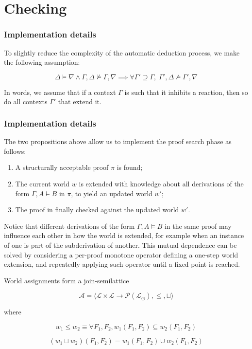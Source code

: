 \section{Checking}



\subsubsection{Implementation details}

To slightly reduce the complexity of the automatic deduction process, we make
the following assumption:

\[
  \Delta \models \nabla \wedge \Gamma, \Delta \not \models \Gamma, \nabla
  \implies \forall \Gamma'
  \supseteq \Gamma, \; \Gamma', \Delta \not \models \Gamma', \nabla
\]

In words, we assume that if a context $\Gamma$ is such that it inhibits a
reaction, then so do all contexts $\Gamma'$ that extend it.

\subsubsection{Implementation details}

The two propositions above allow us to implement the proof search phase as
follows:

\begin{enumerate}
\item A structurally acceptable proof $\pi$ is found;
\item The current world $w$ is extended with knowledge about all derivations
  of the form $\Gamma, A \models B$ in $\pi$, to yield an updated world $w'$;
\item The proof in finally checked against the updated world $w'$.
\end{enumerate}

Notice that different derivations of the form $\Gamma, A \models B$ in the same
proof may influence each other in how the world is extended, for example when an
instance of one is part of the subderivation of another. This mutual dependence
can be solved by considering a per-proof monotone operator defining a one-step
world extension, and repeatedly applying such operator until a fixed point is
reached.

\begin{definition}
  World assignments form a join-semilattice

  \[
    \mathcal{A} = \langle \mathcal{L} \times \mathcal{L} \to
    \mathcal{P}(\mathcal{L}_\odot), \leq, \sqcup \rangle
  \]

  where

  \[
    w_1 \leq w_2 \equiv \forall F_1, F_2, w_1(F_1,F_2) \subseteq w_2(F_1,F_2)
  \]

  \[
    (w_1 \sqcup w_2)(F_1, F_2) = w_1(F_1,F_2) \cup w_2(F_1,F_2)
  \]
\end{definition}

